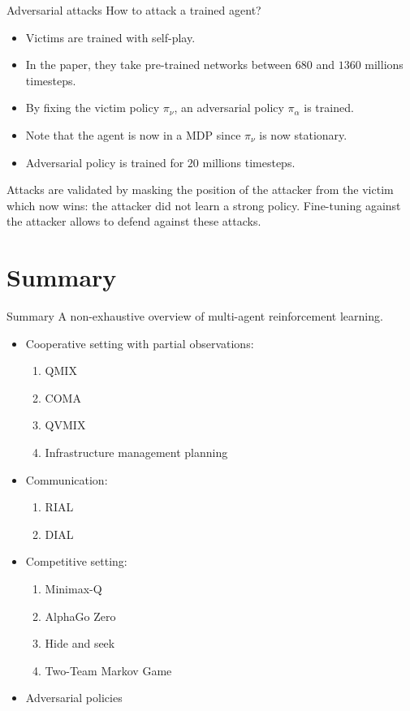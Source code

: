 \documentclass[9pt, hyperref={pdfusetitle,colorlinks=true,allcolors=DarkBlue}]{beamer}
\begin{document}
\begin{frame}{Adversarial attacks}
How to attack a trained agent?
\begin{itemize}
    \item Victims are trained with self-play.
    \item In the paper, they take pre-trained networks between $680$ and $1360$ millions timesteps.
    \item By fixing the victim policy $\pi_\nu$, an adversarial policy $\pi_\alpha$ is trained.
    \item Note that the agent is now in a MDP since $\pi_\nu$ is now stationary.
    \item Adversarial policy is trained for $20$ millions timesteps.
\end{itemize}
\vfill
Attacks are validated by masking the position of the attacker from the victim which now wins: the attacker did not learn a strong policy.
\vfill
Fine-tuning against the attacker allows to defend against these attacks.
\end{frame}
\section{Summary}
\begin{frame}{Summary}
A non-exhaustive overview of multi-agent reinforcement learning.
\begin{itemize}
    \item Cooperative setting with partial observations:
    \begin{enumerate}
        \item QMIX
        \item COMA
        \item QVMIX
        \item Infrastructure management planning
    \end{enumerate}
    \item Communication:
    \begin{enumerate}
        \item RIAL
        \item DIAL
    \end{enumerate}
    \item Competitive setting:
    \begin{enumerate}
        \item Minimax-Q
        \item AlphaGo Zero
        \item Hide and seek
        \item Two-Team Markov Game
    \end{enumerate}
    \item Adversarial policies
\end{itemize}
\end{frame}
\end{document}
